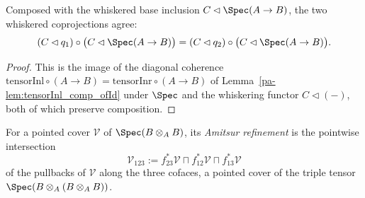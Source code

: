 \begin{lemma}
  \label{pa-lem:whisker_inl_ofId}
  \leanok

  Composed with the whiskered base inclusion \(C \lhd \Spec(A \to B)\), the two whiskered
  coprojections agree:
  \[
    (C \lhd q_1) \circ \bigl(C \lhd \Spec(A \to B)\bigr)
      = (C \lhd q_2) \circ \bigl(C \lhd \Spec(A \to B)\bigr).
  \]
\end{lemma}
\begin{proof}
  \leanok
  This is the image of the diagonal coherence \(\mathrm{tensorInl} \circ (A \to B) =
  \mathrm{tensorInr} \circ (A \to B)\) of Lemma~\ref{pa-lem:tensorInl_comp_ofId} under \(\Spec\)
  and the whiskering functor \(C \lhd (-)\), both of which preserve composition.
\end{proof}

\begin{definition}
  \label{pa-def:amitsurCover}
  \leanok

  For a pointed cover \(\mathcal V\) of \(\Spec(B \otimes_A B)\), its \emph{Amitsur refinement}
  is the pointwise intersection
  \[
    \mathcal V_{123} := f_{23}^{*}\mathcal V \sqcap f_{12}^{*}\mathcal V \sqcap f_{13}^{*}\mathcal V
  \]
  of the pullbacks of \(\mathcal V\) along the three cofaces, a pointed cover of the triple
  tensor \(\Spec(B \otimes_A (B \otimes_A B))\).
\end{definition}

